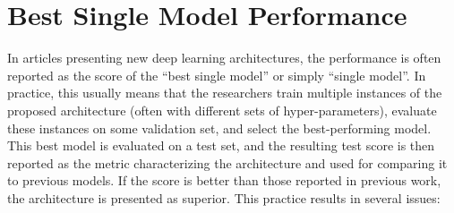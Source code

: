 \documentclass{article}
\newcommand{\ml}{\gls{ml}\xspace}
\newcommand{\dl}{deep learning\xspace}
\begin{document}







\section{Best Single Model Performance}
\label{sec:intro-bestsinglemodel}

In articles presenting new \dl architectures, the performance is often reported as the score of the ``best single model'' or simply ``single model''. In practice, this usually means that the researchers train multiple instances of the proposed architecture (often with different sets of hyper-parameters), evaluate these instances on some validation set, and select the best-performing model. This best model is evaluated on a test set, and the resulting test score is then reported as the metric characterizing the architecture and used for comparing it to previous models. If the score is better than those reported in previous work, the architecture is presented as superior. This practice results in several issues:
\end{document}
